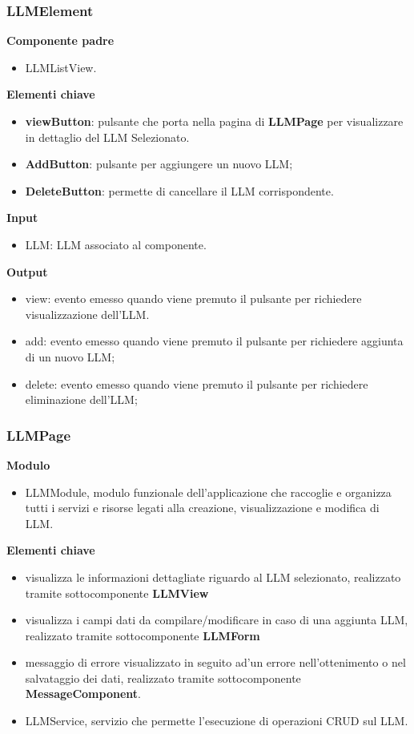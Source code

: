 \subsubsection{LLMElement}
\textbf{Componente padre}
\begin{itemize}
    \item LLMListView.
\end{itemize}
\textbf{Elementi chiave}
\begin{itemize}
    \item \textbf{viewButton}: pulsante che porta nella pagina di \textbf{LLMPage} per visualizzare in dettaglio del LLM Selezionato.
    \item \textbf{AddButton}: pulsante per aggiungere un nuovo LLM; 
    \item \textbf{DeleteButton}: permette di cancellare il LLM corrispondente.
\end{itemize}
\textbf{Input}
\begin{itemize}
    \item LLM: LLM associato al componente.
\end{itemize}
\textbf{Output}
\begin{itemize}
    \item view: evento emesso quando viene premuto il pulsante per richiedere visualizzazione dell'LLM.
    \item add: evento emesso quando viene premuto il pulsante per richiedere aggiunta di un nuovo LLM;
    \item delete: evento emesso quando viene premuto il pulsante per richiedere eliminazione dell'LLM;
\end{itemize}


\subsubsection{LLMPage}
\textbf{Modulo}
\begin{itemize}
    \item LLMModule, modulo funzionale dell'applicazione che raccoglie e organizza tutti i servizi e risorse legati alla creazione, visualizzazione e modifica di LLM. 
\end{itemize}
\textbf{Elementi chiave}
\begin{itemize}
    \item visualizza le informazioni dettagliate riguardo al LLM selezionato, realizzato tramite sottocomponente \textbf{LLMView} 
    \item visualizza i campi dati da compilare/modificare in caso di una aggiunta LLM, realizzato tramite sottocomponente \textbf{LLMForm}  
    \item messaggio di errore visualizzato in seguito ad'un errore nell'ottenimento o nel salvataggio dei dati, realizzato tramite sottocomponente \textbf{MessageComponent}.
\end{itemize}
\begin{itemize}
    \item LLMService, servizio che permette l'esecuzione di operazioni CRUD sul LLM.
\end{itemize}

